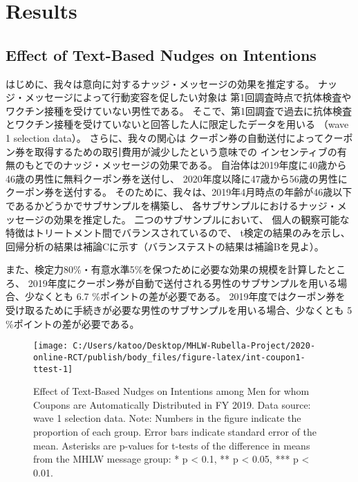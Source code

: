 \documentclass[
  11pt,
  a4paper,
]{article}
\begin{document}
\hypertarget{result}{%
\section{Results}\label{result}}

\hypertarget{intention}{%
\subsection{Effect of Text-Based Nudges on Intentions}\label{intention}}

はじめに、我々は意向に対するナッジ・メッセージの効果を推定する。
ナッジ・メッセージによって行動変容を促したい対象は
第1回調査時点で抗体検査やワクチン接種を受けていない男性である。
そこで、第1回調査で過去に抗体検査とワクチン接種を受けていないと回答した人に限定したデータを用いる
（wave 1 selection data）。
さらに、我々の関心は
クーポン券の自動送付によってクーポン券を取得するための取引費用が減少したという意味での
インセンティブの有無のもとでのナッジ・メッセージの効果である。
自治体は2019年度に40歳から46歳の男性に無料クーポン券を送付し、
2020年度以降に47歳から56歳の男性にクーポン券を送付する。
そのために、我々は、2019年4月時点の年齢が46歳以下であるかどうかでサブサンプルを構築し、
各サブサンプルにおけるナッジ・メッセージの効果を推定した。
二つのサブサンプルにおいて、
個人の観察可能な特徴はトリートメント間でバランスされているので、
t検定の結果のみを示し、回帰分析の結果は補論Cに示す（バランステストの結果は補論Bを見よ）。

また、検定力80\%・有意水準5\%を保つために必要な効果の規模を計算したところ、
2019年度にクーポン券が自動で送付される男性のサブサンプルを用いる場合、少なくとも
6.7
\%ポイントの差が必要である。
2019年度ではクーポン券を受け取るために手続きが必要な男性のサブサンプルを用いる場合、少なくとも
5
\%ポイントの差が必要である。

\begin{figure}[t]
\texttt{[image: C:/Users/katoo/Desktop/MHLW-Rubella-Project/2020-online-RCT/publish/body\_files/figure-latex/int-coupon1-ttest-1]} \caption{Effect of Text-Based Nudges on Intentions among Men for whom Coupons are Automatically Distributed in FY 2019. Data source: wave 1 selection data. Note: Numbers in the figure indicate the proportion of each group. Error bars indicate standard error of the mean. Asterisks are p-values for t-tests of the difference in means from the MHLW message group: * p < 0.1, ** p < 0.05, *** p < 0.01.}\label{fig:int-coupon1-ttest}
\end{figure}
\end{document}
